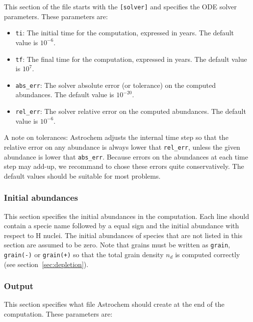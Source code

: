 \documentclass[a4paper,12pt]{article}
\begin{document}
This section of the file starts with the \verb=[solver]= and specifies
the ODE solver parameters. These parameters are:

\begin{itemize}

\item \verb=ti=: The initial time for the computation, expressed in
  years. The default value is $10^{-6}$.

\item \verb=tf=: The final time for the computation, expressed in
  years. The default value is $10^{7}$.

\item \verb=abs_err=: The solver absolute error (or tolerance) on the
  computed abundances. The default value is $10^{-20}$.

\item \verb=rel_err=: The solver relative error on the computed
  abundances. The default value is $10^{-6}$.

\end{itemize}

A note on tolerances: Astrochem adjusts the internal time step so that
the relative error on any abundance is always lower that
\verb=rel_err=, unless the given abundance is lower that
\verb=abs_err=. Because errors on the abundances at each time step may
add-up, we recommand to chose these errors quite conservatively. The
default values should be suitable for most problems.

\subsubsection{Initial abundances}
\label{sec:initial-abundances}

This section specifies the initial abundances in the computation. Each
line should contain a specie name followed by a equal sign and the
initial abundance with respect to H nuclei. The initial abundances of
species that are not listed in this section are assumed to be
zero. Note that grains must be written as \verb=grain=,
\verb=grain(-)= or \verb=grain(+)= so that the total grain density
$n_{d}$ is computed correctly (see section~\ref{sec:depletion}).

\subsubsection{Output}
\label{sec:output}

This section specifies what file Astrochem should create at the end of
the computation. These parameters are:
\end{document}
